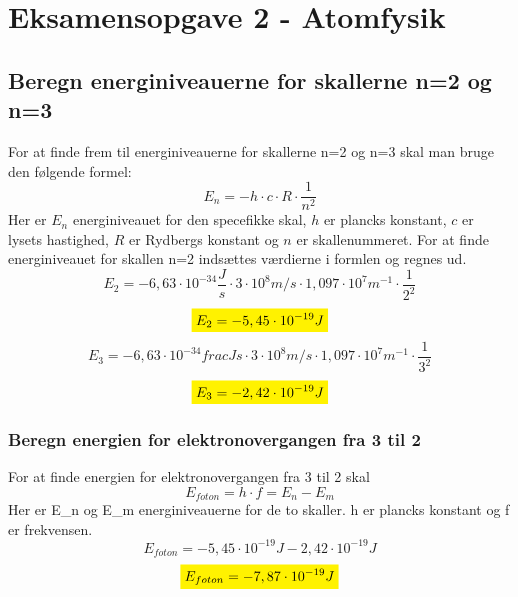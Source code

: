 \section{Eksamensopgave 2 - Atomfysik}
\subsection{Beregn energiniveauerne for skallerne n=2 og n=3}
For at finde frem til energiniveauerne for skallerne n=2 og n=3 skal man bruge den følgende formel:
\begin{equation*}
    E_n=-h\cdot c \cdot R \cdot \frac{1}{n^2}
\end{equation*}
Her er \begin{math}E_n\end{math} energiniveauet for den specefikke skal, \begin{math}h\end{math} er plancks konstant, \begin{math}c\end{math} er lysets hastighed, \begin{math}R\end{math} er Rydbergs konstant og \begin{math}n\end{math} er skallenummeret.
For at finde energiniveauet for skallen n=2 indsættes værdierne i formlen og regnes ud.
\begin{equation*}
    E_2=-6,63 \cdot 10^{-34} \frac{J}{s} \cdot 3 \cdot 10^8 m/s \cdot 1,097 \cdot 10^7 m^{-1}\cdot \frac{1}{2^2}
\end{equation*}
\begin{equation*}
    \mathcolorbox{yellow}{E_2=-5,45 \cdot 10^{-19} J}
\end{equation*}
\begin{equation*}
    E_3=-6,63 \cdot 10^{-34} frac{J}{s}  \cdot 3 \cdot 10^8 m/s \cdot 1,097 \cdot 10^7 m^{-1}\cdot \frac{1}{3^2}
\end{equation*}
\begin{equation*}
    \mathcolorbox{yellow}{E_3=-2,42 \cdot 10^{-19} J}
\end{equation*}
\subsubsection{Beregn energien for elektronovergangen fra 3 til 2}
For at finde energien for elektronovergangen fra 3 til 2 skal
\begin{equation*}
    E_{foton} = h \cdot f = E_n - E_m
\end{equation*}
Her er E\_n og E\_m energiniveauerne for de to skaller. h er plancks konstant og f er frekvensen.
\begin{equation*}
    E_{foton} = -5,45 \cdot 10^{-19} J - 2,42 \cdot 10^{-19} J
\end{equation*}
\begin{equation*}
    \mathcolorbox{yellow}{E_{foton} = -7,87 \cdot 10^{-19} J}
\end{equation*}

